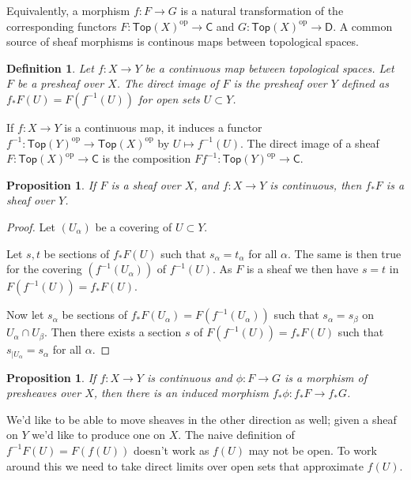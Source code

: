 \documentclass[10pt,a4paper]{article}
\newtheorem{prop}[theo]{Proposition}
\newtheorem{defi}[theo]{Definition}
\newtheorem*{proof}{Proof}
\newcommand{\sh}[1]{#1}
\newcommand{\cat}[1]{\mathsf{#1}}
\newcommand{\topop}[1]{\cat{Top}(#1)^{\mathrm{op}}}
\begin{document}
Equivalently, a morphism $f : \sh{F} \to \sh{G}$ is a natural transformation of
the corresponding functors $\sh{F} : \topop{X} \to \cat{C}$ and $\sh{G} : \topop{X}
\to \cat{D}$.
A common source of sheaf morphisms is continous maps between topological spaces.


\begin{defi}
Let $f : X \to Y$ be a continuous map between topological spaces.
Let $\sh{F}$ be a presheaf over $X$.
The \emph{direct image} of $\sh{F}$ is the presheaf over $Y$ defined as
$f_*\sh{F}(U) = \sh{F}(f^{-1}(U))$ for open sets $U \subset Y$.
\end{defi}

If $f : X \to Y$ is a continuous map, it induces a functor $f^{-1} : \topop{Y}
\to \topop{X}$ by $U \mapsto f^{-1}(U)$.
The direct image of a sheaf $\sh{F} : \topop{X} \to \cat{C}$ is the composition
$\sh{F} f^{-1} : \topop{Y} \to \cat{C}$.


\begin{prop}
If $\sh{F}$ is a sheaf over $X$, and $f : X \to Y$ is continuous, then
$f_*\sh{F}$ is a sheaf over $Y$.
\end{prop}

\begin{proof}
Let $(U_\alpha)$ be a covering of $U \subset Y$.

Let $s, t$ be sections of $f_*\sh{F}(U)$ such that $s_\alpha = t_\alpha$ for
all $\alpha$. The same is then true for the covering $(f^{-1}(U_\alpha))$ of
$f^{-1}(U)$. As $\sh{F}$ is a sheaf we then have $s = t$ in $\sh{F}(f^{-1}(U))
= f_*\sh{F}(U)$.

Now let $s_\alpha$ be sections of $f_*\sh{F}(U_\alpha) = \sh{F}(f^{-1}(U_\alpha))$
such that $s_\alpha = s_\beta$ on $U_\alpha \cap U_\beta$.
Then there exists a section $s$ of $\sh{F}(f^{-1}(U)) = f_*\sh{F}(U)$ such that
$s_{|U_\alpha} = s_\alpha$ for all $\alpha$.
\end{proof}

\begin{prop}
If $f : X \to Y$ is continuous
and $\phi : \sh{F} \to \sh{G}$ is a morphism of presheaves over $X$,
then there is an induced morphism $f_*\phi : f_*\sh{F} \to f_*\sh{G}$.
\end{prop}


We'd like to be able to move sheaves in the other direction as well; given a
sheaf on $Y$ we'd like to produce one on $X$.
The naive definition of $f^{-1}\sh{F}(U) = \sh{F}(f(U))$ doesn't work as $f(U)$
may not be open.
To work around this we need to take direct limits over open sets that
approximate $f(U)$.
\end{document}
